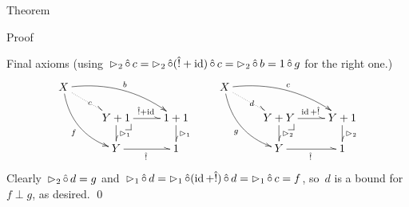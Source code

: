 \documentclass[b]{subfiles}
\begin{document}
\begin{parsec}
\begin{point}{Theorem}
\begin{point}{Proof}
\begin{point}{Final axioms}
    (using~$\mathord{\vartriangleright}_2 \mathop{\hat\circ} c
                = \mathord{\vartriangleright}_2 \mathop{\hat\circ} (\hat{!} + \operatorname{id}) \mathop{\hat\circ} c
                = \mathord{\vartriangleright}_2 \mathop{\hat\circ} b = 1\mathop{\hat\circ} g$ for the right one.)
\begin{equation*}
    \xymatrix@R-.8pc{
        X \ar@^{.>}[rd]|{c}
    \ar@/^1pc/[rrd]^{b}
        \ar@/_1pc/[rdd]_f
        \\& Y+1 \pullback
        \ar@^{>}[r]^{\hat! + \id}
        \ar@^{>}[d]^{\pproj_1}
    & 1+1
        \ar@^{>}[d]^{\pproj_1}
        \\& Y
        \ar@^{>}[r]_{\hat!}
&1
} \qquad
    \xymatrix@R-.8pc{
        X \ar@^{.>}[rd]|{d}
    \ar@/^1pc/[rrd]^{c}
        \ar@/_1pc/[rdd]_g
        \\& Y+Y \pullback
        \ar@^{>}[r]^{\id + \hat!}
        \ar@^{>}[d]^{\pproj_2}
    & Y+1
        \ar@^{>}[d]^{\pproj_2}
        \\& Y
        \ar@^{>}[r]_{\hat!}
&1
}
\end{equation*}
Clearly~$\mathord{\vartriangleright}_2 \mathop{\hat\circ} d = g$
    and~$
    \mathord{\vartriangleright}_1 \mathop{\hat\circ} d
     =  \mathord{\vartriangleright}_1 \mathop{\hat\circ} (\operatorname{id} + \hat! )\mathop{\hat\circ} d
     =  \mathord{\vartriangleright}_1 \mathop{\hat\circ} c  =  f$, so~$d$ is a bound for~$f \perp g$,
     as desired. \qed
\end{point}
\end{point}
\end{point}
\end{parsec}
\end{document}
